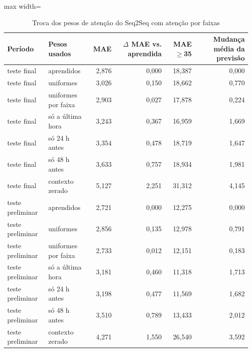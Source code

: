 \begin{table}[!htbp]
    \centering
    \caption{Troca dos pesos de atenção do Seq2Seq com atenção por faixas}
    \label{tab:atencao_seq2seq_attention_new__huber}
    \small
    \begin{adjustbox}{max width=\textwidth}
    \begin{tabular}{llrrrr}
        \toprule
        Período & Pesos usados & MAE & $\Delta$ MAE vs. aprendida & MAE $\geq$35 & Mudança média da previsão \\
        \midrule
        teste final & aprendidos & 2,876 & 0,000 & 18,387 & 0,000 \\
        teste final & uniformes & 3,026 & 0,150 & 18,662 & 0,770 \\
        teste final & uniformes por faixa & 2,903 & 0,027 & 17,878 & 0,224 \\
        teste final & só a última hora & 3,243 & 0,367 & 16,959 & 1,669 \\
        teste final & só 24 h antes & 3,354 & 0,478 & 18,719 & 1,647 \\
        teste final & só 48 h antes & 3,633 & 0,757 & 18,934 & 1,981 \\
        teste final & contexto zerado & 5,127 & 2,251 & 31,312 & 4,145 \\
        teste preliminar & aprendidos & 2,721 & 0,000 & 12,275 & 0,000 \\
        teste preliminar & uniformes & 2,856 & 0,135 & 12,978 & 0,791 \\
        teste preliminar & uniformes por faixa & 2,733 & 0,012 & 12,151 & 0,183 \\
        teste preliminar & só a última hora & 3,181 & 0,460 & 11,318 & 1,713 \\
        teste preliminar & só 24 h antes & 3,198 & 0,477 & 11,569 & 1,682 \\
        teste preliminar & só 48 h antes & 3,510 & 0,789 & 13,433 & 2,012 \\
        teste preliminar & contexto zerado & 4,271 & 1,550 & 26,540 & 3,592 \\
        \bottomrule
    \end{tabular}
    \end{adjustbox}
\end{table}
